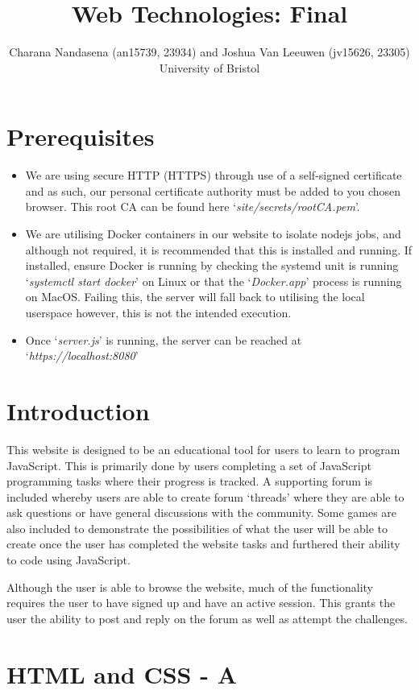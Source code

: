 \documentclass[a4paper]{article}
\title{Web Technologies: Final}
\author{Charana Nandasena (an15739, 23934) and Joshua Van Leeuwen (jv15626, 23305)\\ 
University of Bristol}
\begin{document}
\maketitle

\section{Prerequisites}
\begin{itemize}
  \item{We are using secure HTTP (HTTPS) through use of a self-signed certificate and as
    such, our personal certificate authority must be added to you chosen
    browser. This root CA can be found here `\textit{site/secrets/rootCA.pem}'.}
  \item{We are utilising Docker containers in our website to isolate nodejs
    jobs, and although not required, it is recommended that this is installed
    and running. If installed, ensure Docker is running by checking the
    systemd unit is running `\textit{systemctl start docker}' on Linux or that the
    `\textit{Docker.app}' process is running on MacOS. Failing this, the server
    will fall back to utilising the local userspace however, this is not the
    intended execution.}
  \item{Once `\textit{server.js}' is running, the server can be reached at
    `\textit{https://localhost:8080}'}
\end{itemize}

\section {Introduction}
This website is designed to be an educational tool for users to learn to program
JavaScript. This is primarily done by users completing a set of JavaScript
programming tasks where their progress is tracked. A supporting forum is
included whereby users are able to create forum `threads' where they are able to
ask questions or have general discussions with the community. Some games are
also included to demonstrate the possibilities of what the user will be able to
create once the user has completed the website tasks and furthered their ability
to code using JavaScript.

Although the user is able to browse the website, much of the functionality
requires the user to have signed up and have an active session. This grants the
user the ability to post and reply on the forum as well as attempt the
challenges.

\section {HTML and CSS - A}
\end{document}
